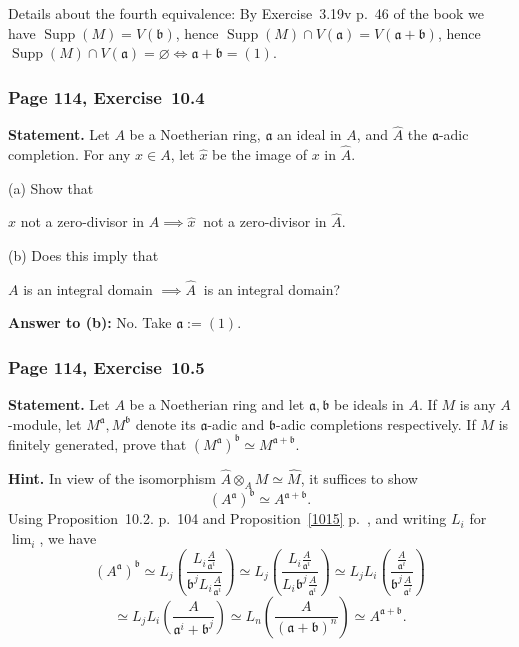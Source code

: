 \documentclass[12pt,letterpaper]{article}%
\newcommand{\oo}{\operatorname}\newcommand{\ooo}{\operatorname*}
\newcommand{\mf}{\mathfrak}
\newcommand{\aaa}{\mf a}
\newcommand{\bbb}{\mf b}
\newcommand{\nn}{\noindent}
\begin{document}
\nn Details about the fourth equivalence: By Exercise~3.19v p.~46 of the book we have $\oo{Supp}(M)=V(\bbb)$, hence $\oo{Supp}(M)\cap V(\aaa)=V(\aaa+\bbb)$, hence $\oo{Supp}(M)\cap V(\aaa)=\varnothing\iff\aaa+\bbb=(1)$. 

\subsubsection{Page 114, Exercise~10.4}%

\textbf{Statement.} Let $A$ be a Noetherian ring, $\aaa$ an ideal in $A$, and $\widehat A$ the $\aaa$-adic completion. For any $x\in A$, let $\widehat x$ be the image of $x$ in $\widehat A$. 

\nn(a) Show that\smallskip 

\centerline{$x$ not a zero-divisor in $A\implies\widehat x\ $ not a zero-divisor in $\widehat A$.} 

\nn(b) Does this imply that\smallskip 

\centerline{$A$ is an integral domain $\implies\widehat A\ $ is an integral domain?}

\nn\textbf{Answer to (b):} No. Take $\aaa:=(1)$. 

\subsubsection{Page 114, Exercise~10.5}%

\textbf{Statement.} Let $A$ be a Noetherian ring and let $\aaa,\bbb$ be ideals in $A$. If $M$ is any $A$-module, let $M^\aaa,M^\bbb$ denote its $\aaa$-adic and $\bbb$-adic completions respectively. If $M$ is finitely generated, prove that $(M^\aaa)^\bbb\simeq M^{\aaa+\bbb}$.

\nn\textbf{Hint.} In view of the isomorphism $\widehat A\otimes_AM\simeq\widehat M$, it suffices to show 
\begin{equation}\label{aba+b}
(A^\aaa)^\bbb\simeq A^{\aaa+\bbb}. 
\end{equation} 
Using Proposition~10.2. p.~104 and Proposition~\ref{1015} p.~\pageref{1015}, and writing $L_i$ for $\lim_i$, we have 
$$
(A^\aaa)^\bbb\simeq 
L_j\left(\frac{L_i\frac{A}{\aaa^i}}{\bbb^jL_i\frac{A}{\aaa^i}}\right)\simeq 
L_j\left(\frac{L_i\frac{A}{\aaa^i}}{L_i\bbb^j\frac{A}{\aaa^i}}\right)\simeq 
L_jL_i\left(\frac{\frac{A}{\aaa^i}}{\bbb^j\frac{A}{\aaa^i}}\right)
$$ 
$$
\simeq L_jL_i\left(\frac{A}{\aaa^i+\bbb^j}\right)
\simeq L_n\left(\frac{A}{(\aaa+\bbb)^n}\right)
\simeq A^{\aaa+\bbb}.
$$ 
\end{document}
